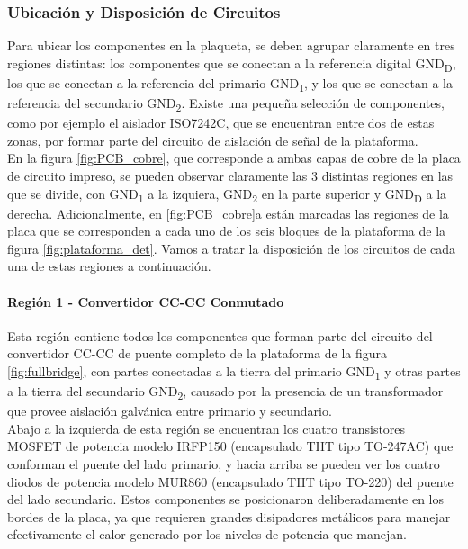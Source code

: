 \subsubsection{Ubicación y Disposición de Circuitos}

Para ubicar los componentes en la plaqueta, se deben agrupar claramente en tres regiones distintas: los componentes que se conectan a la referencia digital GND\textsubscript{D}, los que se conectan a la referencia del primario GND\textsubscript{1}, y los que se conectan a la referencia del secundario GND\textsubscript{2}. Existe una pequeña selección de componentes, como por ejemplo el aislador ISO7242C, que se encuentran entre dos de estas zonas, por formar parte del circuito de aislación de señal de la plataforma.\\ 

En la figura \ref{fig:PCB_cobre}, que corresponde a ambas capas de cobre de la placa de circuito impreso, se pueden observar claramente las 3 distintas regiones en las que se divide, con GND\textsubscript{1} a la izquiera, GND\textsubscript{2} en la parte superior y GND\textsubscript{D} a la derecha. Adicionalmente, en \ref{fig:PCB_cobre}a están marcadas las regiones de la placa que se corresponden a cada uno de los seis bloques de la plataforma de la figura \ref{fig:plataforma_det}. Vamos a tratar la disposición de los circuitos de cada una de estas regiones a continuación.\\

\paragraph{Región 1 - Convertidor CC-CC Conmutado}

Esta región contiene todos los componentes que forman parte del circuito del convertidor CC-CC de puente completo de la plataforma de la figura \ref{fig:fullbridge}, con partes conectadas a la tierra del primario GND\textsubscript{1} y otras partes a la tierra del secundario GND\textsubscript{2}, causado por la presencia de un transformador que provee aislación galvánica entre primario y secundario.\\

Abajo a la izquierda de esta región se encuentran los cuatro transistores MOSFET de potencia modelo IRFP150 (encapsulado THT tipo TO-247AC) que conforman el puente del lado primario, y hacia arriba se pueden ver los cuatro diodos de potencia modelo MUR860 (encapsulado THT tipo TO-220) del puente del lado secundario. Estos componentes se posicionaron deliberadamente en los bordes de la placa, ya que requieren grandes disipadores metálicos para manejar efectivamente el calor generado por los niveles de potencia que manejan.\\

